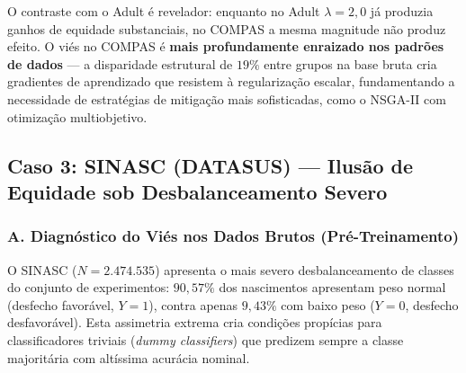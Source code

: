 O contraste com o Adult é revelador: enquanto no Adult $\lambda = 2,0$ já produzia ganhos de equidade substanciais, no COMPAS a mesma magnitude não produz efeito. O viés no COMPAS é \textbf{mais profundamente enraizado nos padrões de dados} --- a disparidade estrutural de $19\%$ entre grupos na base bruta cria gradientes de aprendizado que resistem à regularização escalar, fundamentando a necessidade de estratégias de mitigação mais sofisticadas, como o NSGA-II com otimização multiobjetivo.

\subsection{Caso 3: SINASC (DATASUS) --- Ilusão de Equidade sob Desbalanceamento Severo}
\label{subsec:caso_sinasc}

\subsubsection{A. Diagnóstico do Viés nos Dados Brutos (Pré-Treinamento)}

O SINASC ($N = 2.474.535$) apresenta o mais severo desbalanceamento de classes do conjunto de experimentos: $90,57\%$ dos nascimentos apresentam peso normal (desfecho favorável, $Y=1$), contra apenas $9,43\%$ com baixo peso ($Y=0$, desfecho desfavorável). Esta assimetria extrema cria condições propícias para classificadores triviais (\textit{dummy classifiers}) que predizem sempre a classe majoritária com altíssima acurácia nominal.

